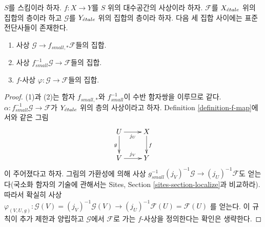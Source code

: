 \begin{lemma}
\label{lemma-f-map}
$S$를 스킴이라 하자.
$f : X \to Y$를 $S$ 위의 대수공간의 사상이라 하자.
$\mathcal{F}$를 $X_{\acute{e}tale}$ 위의 집합의 층이라 하고
$\mathcal{G}$를 $Y_{\acute{e}tale}$ 위의 집합의 층이라 하자.
다음 세 집합 사이에는 표준 전단사들이 존재한다.
\begin{enumerate}
\item 사상 $\mathcal{G} \to f_{small, *}\mathcal{F}$들의 집합.
\item 사상 $f_{small}^{-1}\mathcal{G} \to \mathcal{F}$들의 집합.
\item $f$-사상 $\varphi : \mathcal{G} \to \mathcal{F}$들의 집합.
\end{enumerate}
\end{lemma}

\begin{proof}
(1)과 (2)는 함자 $f_{small, *}$와 $f_{small}^{-1}$이 수반 함자쌍을
이루므로 같다.
$\alpha : f_{small}^{-1}\mathcal{G} \to \mathcal{F}$가
$Y_{\acute{e}tale}$ 위의 층의 사상이라고 하자. Definition
\ref{definition-f-map}에서와 같은 그림
$$
\xymatrix{
U \ar[d]_g \ar[r]_{j_U} & X \ar[d]^f \\
V \ar[r]^{j_V} & Y
}
$$
이 주어졌다고 하자. 그림의 가환성에 의해 사상
$g_{small}^{-1}(j_V)^{-1}\mathcal{G} \to (j_U)^{-1}\mathcal{F}$도
얻는다(국소화 함자의 기술에 관해서는 Sites, Section
\ref{sites-section-localize}과 비교하라). 따라서 확실히 사상
$\varphi_{(V, U, g)} :
\mathcal{G}(V) = (j_V)^{-1}\mathcal{G}(V)
\to
(j_U)^{-1}\mathcal{F}(U) = \mathcal{F}(U)$
를 얻는다. 이 규칙이 추가 제한과 양립하고
$\mathcal{G}$에서 $\mathcal{F}$로 가는 $f$-사상을 정의한다는
확인은 생략한다.


\end{proof}
